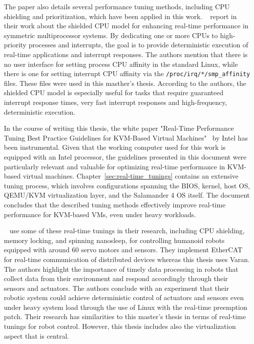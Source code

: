 \documentclass[MMR,Master,english]{twbook}
\begin{document}
\noindent The paper also details several performance tuning methods, including CPU shielding and prioritization, which have been applied in this work.
\clearpage
\bigskip \noindent \citeauthor{broskyShieldedProcessorsGuaranteeing2003}~\cite{broskyShieldedProcessorsGuaranteeing2003} report in their work about the shielded CPU model for enhancing real-time performance in symmetric multiprocessor systems. By dedicating one or more CPUs to high-priority processes and interrupts, the goal is to provide deterministic execution of real-time applications and interrupt responses. The authors mention that there is no user interface for setting process CPU affinity in the standard Linux, while there is one for setting interrupt CPU affinity via the \texttt{/proc/irq/*/smp\_affinity} files. These files were used in this masther's thesis. According to the authors, the shielded CPU model is especially useful for tasks that require guaranteed interrupt response times, very fast interrupt responses and high-frequency, deterministic execution.

\bigskip \noindent In the course of writing this thesis, the white paper "Real-Time Performance Tuning Best Practice Guidelines for KVM-Based Virtual Machines"~\cite{RealTimePerformanceTuning2022} by Intel has been instrumental. Given that the working computer used for this work is equipped with an Intel processor, the guidelines presented in this document were particularly relevant and valuable for optimizing real-time performance in KVM-based virtual machines. Chapter~\ref{sec:real-time_tunings} contains an extensive tuning process, which involves configurations spanning the BIOS, kernel, host OS, QEMU/KVM virtualization layer, and the Salamander 4 OS itself. The document concludes that the described tuning methods effectively improve real-time performance for KVM-based VMs, even under heavy workloads.

\bigskip \noindent \citeauthor{yoonRealTimePerformanceAnalysis}~\cite{yoonRealTimePerformanceAnalysis} use some of these real-time tunings in their research, including CPU shielding, memory locking, and spinning nanosleep, for controlling humanoid robots equipped with around 60 servo motors and sensors. They implement EtherCAT for real-time communication of distributed devices whereas this thesis uses Varan. The authors highlight the importance of timely data processing in robots that collect data from their environment and respond accordingly through their sensors and actuators. The authors conclude with an experiment that their robotic system could achieve deterministic control of actuators and sensors even under heavy system load through the use of Linux with the real-time preemption patch. Their research has similarities to this master's thesis in terms of real-time tunings for robot control. However, this thesis includes also the virtualization aspect that is central.
\end{document}
